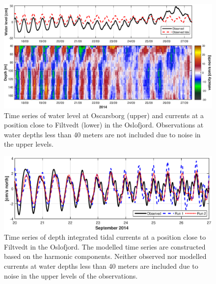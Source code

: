 \begin{figure}[!t]
\centering
\includegraphics[width=\textwidth]{fig_Filtvedt_timeseries_obs}
\caption{Time series of water level at Oscarsborg (upper) and currents at a position close to Filtvedt (lower) in the Oslofjord. Observations at water depths less than 40 meters are not included due to noise in the upper levels.}
\label{fig:Filtvedt_timeseries_obs}
\end{figure}


\begin{figure}[!t]
\centering
\includegraphics[width=\textwidth]{fig_Filtvedt_timeseries}
\caption{Time series of depth integrated tidal currents at a position close to Filtvedt in the Oslofjord. The modelled time series are constructed based on the harmonic components. Neither observed nor modelled currents at water depths less than 40 meters are included due to noise in the upper levels of the observations.}
\label{fig:Filtvedt_timeseries}
\end{figure}



